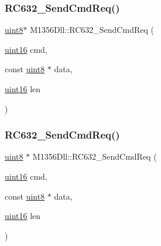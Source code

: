 \subsubsection{\texorpdfstring{RC632\_SendCmdReq()}{RC632\_SendCmdReq()}\hspace{0.1cm}{\footnotesize\ttfamily [1/2]}}
{\footnotesize\ttfamily \mbox{\hyperlink{inc_2m1356dll_8h_adde6aaee8457bee49c2a92621fe22b79}{uint8}}$\ast$ M1356\+Dll\+::\+R\+C632\+\_\+\+Send\+Cmd\+Req (\begin{DoxyParamCaption}\item[{\mbox{\hyperlink{inc_2m1356dll_8h_a05f6b0ae8f6a6e135b0e290c25fe0e4e}{uint16}}}]{cmd,  }\item[{const \mbox{\hyperlink{inc_2m1356dll_8h_adde6aaee8457bee49c2a92621fe22b79}{uint8}} $\ast$}]{data,  }\item[{\mbox{\hyperlink{inc_2m1356dll_8h_a05f6b0ae8f6a6e135b0e290c25fe0e4e}{uint16}}}]{len }\end{DoxyParamCaption})}

\mbox{\label{class_m1356_dll_a1fef83590eef30001297f59a7073d31e}} 
\subsubsection{\texorpdfstring{RC632\_SendCmdReq()}{RC632\_SendCmdReq()}\hspace{0.1cm}{\footnotesize\ttfamily [2/2]}}
{\footnotesize\ttfamily \mbox{\hyperlink{inc_2m1356dll_8h_adde6aaee8457bee49c2a92621fe22b79}{uint8}} $\ast$ M1356\+Dll\+::\+R\+C632\+\_\+\+Send\+Cmd\+Req (\begin{DoxyParamCaption}\item[{\mbox{\hyperlink{inc_2m1356dll_8h_a05f6b0ae8f6a6e135b0e290c25fe0e4e}{uint16}}}]{cmd,  }\item[{const \mbox{\hyperlink{inc_2m1356dll_8h_adde6aaee8457bee49c2a92621fe22b79}{uint8}} $\ast$}]{data,  }\item[{\mbox{\hyperlink{inc_2m1356dll_8h_a05f6b0ae8f6a6e135b0e290c25fe0e4e}{uint16}}}]{len }\end{DoxyParamCaption})}

